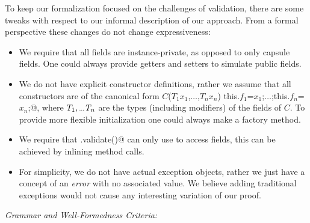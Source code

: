 To keep our formalization focused on
the challenges of validation, 
there are some
tweaks with respect to our informal description of our approach.
From a formal perspective 
these changes do not change expressiveness:
\begin{itemize}
\item We require that all fields are instance-private, as opposed to only capsule fields. One could always provide getters and setters to simulate public fields.
\item We do not have explicit constructor definitions, rather we assume that all constructors are of the canonical form
\Q@$C$($T_1 x_1$,$\ldots$,$T_n x_n$) {this.$f_1$=$x_1$;$\ldots$;this.$f_n$=$x_n$;}@,
 where $T_1,\ldots\T_n$ are the types (including modifiers) of the fields of $C$.
To provide more flexible initialization one could always make a factory method.
\item We require that \Q@.validate()@ can only use \Q@this@ to access fields,
this can be achieved by inlining method calls.
\item For simplicity, we do not have actual exception objects,
rather we just have a concept of an \emph{error} with no associated value.
We believe adding traditional exceptions would not cause any interesting variation of our proof.
\end{itemize}


\loseSpace
\noindent\textit{Grammar and Well-Formedness Criteria:}

